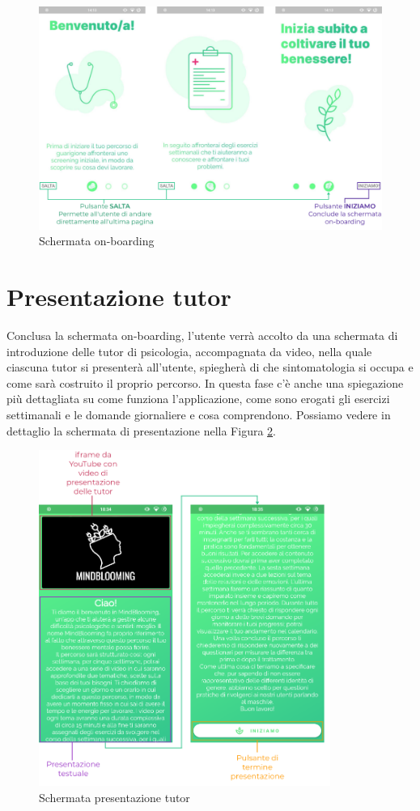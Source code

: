 \begin{figure}[h!]
\centering
\includegraphics[width=\textwidth]{img/on_boarding}
\caption{Schermata on-boarding}
\label{fig:on_boarding}
\end{figure}

\newpage
\section{Presentazione tutor}
Conclusa la schermata on-boarding, l'utente verrà accolto da una schermata di introduzione delle tutor di psicologia, accompagnata da video, nella quale ciascuna tutor si presenterà all'utente, spiegherà di che sintomatologia si occupa e come sarà costruito il proprio percorso. In questa fase c'è anche una spiegazione più dettagliata su come funziona l'applicazione, come sono erogati gli esercizi settimanali e le domande giornaliere e cosa comprendono. Possiamo vedere in dettaglio la schermata di presentazione nella Figura \ref{fig:presentazione_tutor}.

\begin{figure}[h!]
\centering
\includegraphics[width=0.85\textwidth]{img/presentazione_tutor}
\caption{Schermata presentazione tutor}
\label{fig:presentazione_tutor}
\end{figure}

